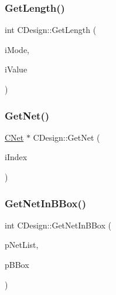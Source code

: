 \mbox{\label{classCDesign_a2ff679a94a04886d69604e7d6820830b}} 
\subsubsection{\texorpdfstring{GetLength()}{GetLength()}}
{\footnotesize\ttfamily int C\+Design\+::\+Get\+Length (\begin{DoxyParamCaption}\item[{int}]{i\+Mode,  }\item[{int}]{i\+Value }\end{DoxyParamCaption})}

\mbox{\label{classCDesign_a88d8a50b50adf87e7d53b52757f5a04c}} 
\subsubsection{\texorpdfstring{GetNet()}{GetNet()}}
{\footnotesize\ttfamily \mbox{\hyperlink{classCNet}{C\+Net}} $\ast$ C\+Design\+::\+Get\+Net (\begin{DoxyParamCaption}\item[{int}]{i\+Index }\end{DoxyParamCaption})}

\mbox{\label{classCDesign_a5ab5f93449266153a28914c319626289}} 
\subsubsection{\texorpdfstring{GetNetInBBox()}{GetNetInBBox()}}
{\footnotesize\ttfamily int C\+Design\+::\+Get\+Net\+In\+B\+Box (\begin{DoxyParamCaption}\item[{vector$<$ \mbox{\hyperlink{classCNet}{C\+Net}} $\ast$ $>$ $\ast$}]{p\+Net\+List,  }\item[{\mbox{\hyperlink{classCBBox}{C\+B\+Box}} $\ast$}]{p\+B\+Box }\end{DoxyParamCaption})}

\mbox{\label{classCDesign_ab3fcdbedca2a1f107507ec6bd7f4677a}} 
